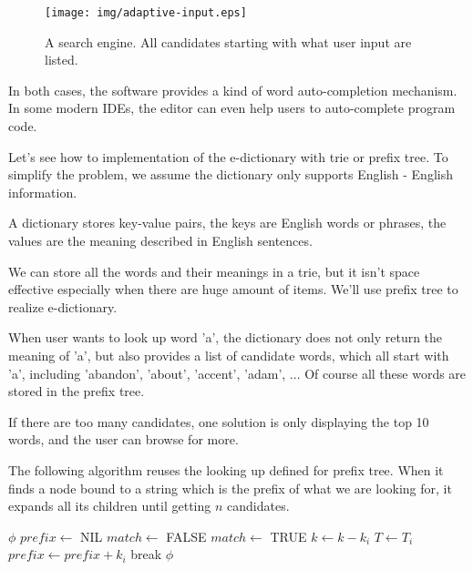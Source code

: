 \documentclass{article}
\begin{document}
\begin{figure}[htbp]
  \centering
  \texttt{[image: img/adaptive-input.eps]}
  \caption{A search engine. All candidates starting with what user input are listed.}
  \label{fig:word-completion}
\end{figure}

In both cases, the software provides a kind of word auto-completion mechanism.
In some modern IDEs, the editor can even help users to auto-complete program code.

Let's see how to implementation of the e-dictionary with trie or prefix tree.
To simplify the problem, we assume the dictionary only supports English - English
information.

A dictionary stores key-value pairs, the keys are English
words or phrases, the values are the meaning described in English sentences.

We can store all the words and their meanings in a trie, but it isn't
space effective especially when there are huge amount of items. We'll use
prefix tree to realize e-dictionary.

When user wants to look up word 'a', the dictionary does not only
return the meaning of 'a', but also provides a list of
candidate words, which all start with 'a', including 'abandon', 'about',
'accent', 'adam', ... Of course all these words are stored in the prefix tree.

If there are too many candidates, one solution is only displaying the top 10
words, and the user can browse for more.

The following algorithm reuses the looking up defined for prefix tree. When it
finds a node bound to a string which is the prefix of what we are looking for,
it expands all its children until getting $n$ candidates.

\begin{algorithmic}[1]
     \State \Return $\phi$
  \EndIf
  \State $prefix \gets$ NIL
  \Repeat
    \State $match \gets$ FALSE
        \State \Return {}
      \EndIf
        \State $match \gets$ TRUE
        \State $k \gets k - k_i$
        \State $T \gets T_i$
        \State $prefix \gets prefix + k_i$
        \State break
      \EndIf
    \EndFor
  \State \Return $\phi$
\EndFunction
\end{algorithmic}
\end{document}
